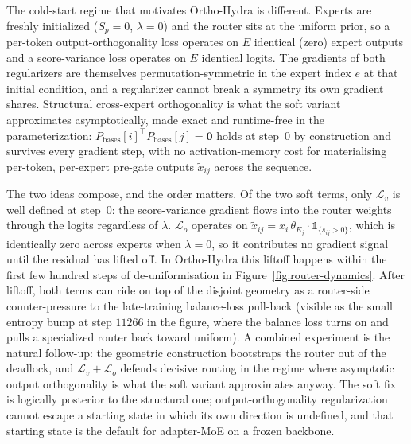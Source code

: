\documentclass[10pt]{article}
\newcommand{\T}{^{\!\top}}
\newcommand{\Pbases}{P_{\mathrm{bases}}}
\begin{document}
The cold-start regime that motivates Ortho-Hydra is different.
Experts are freshly initialized ($S_p\!=\!0$, $\lambda\!=\!0$) and
the router sits at the uniform prior, so a per-token
output-orthogonality loss operates on $E$ identical (zero) expert
outputs and a score-variance loss operates on $E$ identical logits.
The gradients of both regularizers are themselves
permutation-symmetric in the expert index $e$ at that initial
condition, and a regularizer cannot break a symmetry its own
gradient shares. Structural cross-expert orthogonality is what the
soft variant approximates asymptotically, made exact and runtime-free
in the parameterization: $\Pbases[i]\T\Pbases[j] = \mathbf{0}$ holds
at step~$0$ by construction and survives every gradient step, with
no activation-memory cost for materialising per-token, per-expert
pre-gate outputs $\tilde x_{ij}$ across the sequence.

The two ideas compose, and the order matters. Of the two soft terms,
only $\mathcal{L}_v$ is well defined at step~$0$: the score-variance
gradient flows into the router weights through the logits regardless
of $\lambda$. $\mathcal{L}_o$ operates on $\tilde x_{ij} = x_i\,
\theta_{E_j}\!\cdot\!\mathbb{1}_{\{s_{ij}>0\}}$, which is identically
zero across experts when $\lambda\!=\!0$, so it contributes no
gradient signal until the residual has lifted off. In Ortho-Hydra
this liftoff happens within the first few hundred steps of
de-uniformisation in Figure~\ref{fig:router-dynamics}. After
liftoff, both terms can ride on top of the disjoint geometry as a
router-side counter-pressure to the late-training balance-loss
pull-back (visible as the small entropy bump at step $11266$ in the
figure, where the balance loss turns on and pulls a specialized
router back toward uniform). A combined experiment is the natural
follow-up: the geometric construction bootstraps the router out of
the deadlock, and $\mathcal{L}_v + \mathcal{L}_o$ defends decisive
routing in the regime where asymptotic output orthogonality is what
the soft variant approximates anyway. The soft fix is logically
posterior to the structural one; output-orthogonality regularization
cannot escape a starting state in which its own direction is
undefined, and that starting state is the default for adapter-MoE on
a frozen backbone.
\end{document}
